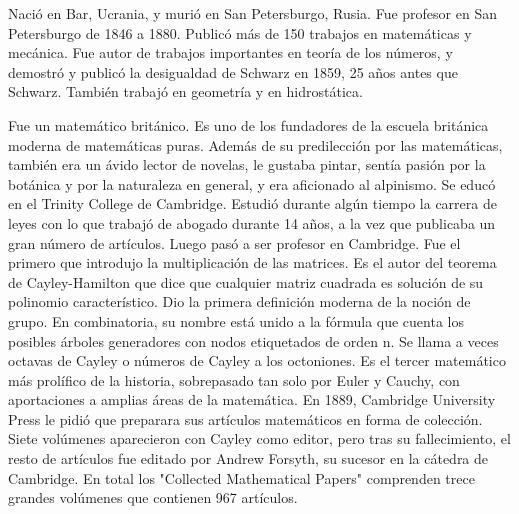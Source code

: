 \begin{parchment}{ Nació en Bar, Ucrania, y murió en San Petersburgo, Rusia.  Fue profesor en San Petersburgo de 1846 a 1880. Publicó más de 150 trabajos en matemáticas y mecánica. Fue autor de trabajos importantes en teoría de los números, y demostró y publicó la desigualdad de Schwarz en 1859, 25 años antes que Schwarz. También trabajó en geometría y en hidrostática.}
\end{parchment}

\begin{parchment} {Fue un matemático británico. Es uno de los fundadores de la escuela británica moderna de matemáticas puras.
Además de su predilección por las matemáticas, también era un ávido lector de novelas, le gustaba pintar, sentía pasión por la botánica y por la naturaleza en general, y era aficionado al alpinismo.
Se educó en el Trinity College de Cambridge. Estudió durante algún tiempo la carrera de leyes con lo que trabajó de abogado durante 14 años, a la vez que publicaba un gran número de artículos. Luego pasó a ser profesor en Cambridge. Fue el primero que introdujo la multiplicación de las matrices. Es el autor del teorema de Cayley-Hamilton que dice que cualquier matriz cuadrada es solución de su polinomio característico.
Dio la primera definición moderna de la noción de grupo.
En combinatoria, su nombre está unido a la fórmula que cuenta los posibles árboles generadores con nodos etiquetados de orden n.
Se llama a veces octavas de Cayley o números de Cayley a los octoniones.
Es el tercer matemático más prolífico de la historia, sobrepasado tan solo por Euler y Cauchy, con aportaciones a amplias áreas de la matemática. En 1889, Cambridge University Press le pidió que preparara sus artículos matemáticos en forma de colección. Siete volúmenes aparecieron con Cayley como editor, pero tras su fallecimiento, el resto de artículos fue editado por Andrew Forsyth, su sucesor en la cátedra de Cambridge. En total los "Collected Mathematical Papers" comprenden trece grandes volúmenes que contienen 967 artículos.}
\end{parchment}



